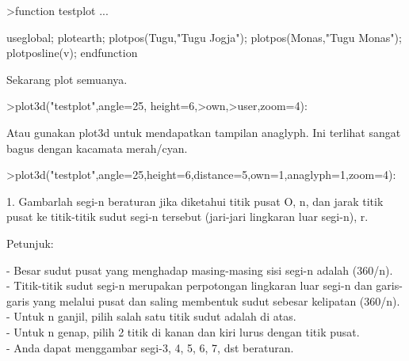 \documentclass[12pt,Times new roman,letterpaper]{book}
\begin{document}
\begin{eulernootebook}
\begin{eulercomment}
\begin{eulercomment}
\begin{eulernootebook}
\begin{eulercomment}
\begin{eulercomment}
\begin{eulercomment}
\begin{eulercomment}
\begin{eulercomment}
\begin{eulercomment}
\begin{eulernotebook}
\begin{eulercomment}
\begin{eulercomment}
\begin{eulercomment}
\begin{eulercomment}
\begin{eulercomment}
\begin{eulerprompt}
>function testplot ...
\end{eulerprompt}
\begin{eulerudf}
  useglobal;
  plotearth;
  plotpos(Tugu,"Tugu Jogja"); plotpos(Monas,"Tugu Monas");
  plotposline(v);
  endfunction
\end{eulerudf}
\begin{eulercomment}
Sekarang plot semuanya.
\end{eulercomment}
\begin{eulerprompt}
>plot3d("testplot",angle=25, height=6,>own,>user,zoom=4):
\end{eulerprompt}
\begin{eulercomment}
Atau gunakan plot3d untuk mendapatkan tampilan anaglyph. Ini terlihat
sangat bagus dengan kacamata merah/cyan.
\end{eulercomment}
\begin{eulerprompt}
>plot3d("testplot",angle=25,height=6,distance=5,own=1,anaglyph=1,zoom=4):
\end{eulerprompt}
\begin{eulercomment}
1. Gambarlah segi-n beraturan jika diketahui titik pusat O, n, dan
jarak titik pusat ke titik-titik sudut segi-n tersebut (jari-jari
lingkaran luar segi-n), r.

Petunjuk:

- Besar sudut pusat yang menghadap masing-masing sisi segi-n adalah
(360/n).\\
- Titik-titik sudut segi-n merupakan perpotongan lingkaran luar segi-n
dan garis-garis yang melalui pusat dan saling membentuk sudut sebesar
kelipatan (360/n).\\
- Untuk n ganjil, pilih salah satu titik sudut adalah di atas.\\
- Untuk n genap, pilih 2 titik di kanan dan kiri lurus dengan titik
pusat.\\
- Anda dapat menggambar segi-3, 4, 5, 6, 7, dst beraturan.


\end{eulercomment}
\end{eulercomment}
\end{eulercomment}
\end{eulercomment}
\end{eulercomment}
\end{eulercomment}
\end{eulernotebook}
\end{eulercomment}
\end{eulercomment}
\end{eulercomment}
\end{eulercomment}
\end{eulercomment}
\end{eulercomment}
\end{eulernootebook}
\end{eulercomment}
\end{eulercomment}
\end{eulernootebook}
\end{document}
